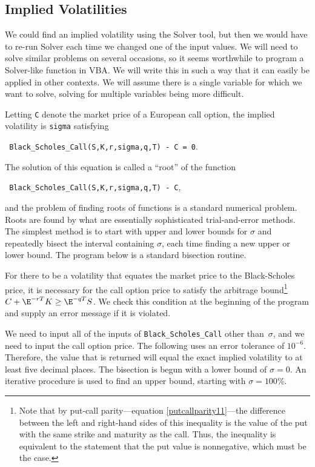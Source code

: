 \subsection*{Implied Volatilities}
We could find an implied volatility using the Solver tool, but then we would have to re-run Solver each time we changed one of the input values.  We will need to solve similar problems on several occasions, so it seems worthwhile to program a Solver-like function in VBA.  We will write this in such a way that it can easily be applied in other contexts.  We will assume there is a single variable for which we want to solve, solving for multiple variables being  more difficult.

Letting \verb!C! denote the market price of a European call option, the implied volatility is \verb!sigma! satisfying
\small\begin{center}
\verb! Black_Scholes_Call(S,K,r,sigma,q,T) - C = 0!.
\end{center}\normalsize
The solution of this equation is called a ``root'' of the function 
\small\begin{center}
\verb! Black_Scholes_Call(S,K,r,sigma,q,T) - C!,
\end{center}\normalsize
and the problem of finding roots of functions is a standard numerical problem.  Roots are found by what are essentially sophisticated trial-and-error methods.  The simplest method is to start with upper and lower bounds for $\sigma$ and repeatedly bisect the interval containing $\sigma$, each time finding a new upper or lower bound.   The program below is a standard bisection routine.


For there to be a volatility that equates the market price to the Black-Scholes price, it is necessary for the call option price to satisfy the arbitrage bound\footnote{Note that by put-call parity---equation \eqref{putcallparity11}---the difference between the left and right-hand sides of this inequality is the value of the put with the same strike and maturity as the call.  Thus, the inequality is equivalent to the statement that the put value is nonnegative, which must be the case.} $C +\E^{-rT}K \geq \E^{-qT}S$.  We check this condition at the beginning of the program and supply an error message if it is violated.  

We need to input  all of the inputs of \verb!Black_Scholes_Call! other than~$\sigma$, and we need to input the call option price.  The following uses an error tolerance of $10^{-6}$. 
Therefore, the value that is returned will equal the exact implied volatility to at least five decimal places.  The bisection is begun with a lower bound of $\sigma =0$.  An iterative procedure is used to find an upper bound, starting with $\sigma = 100$\%.

